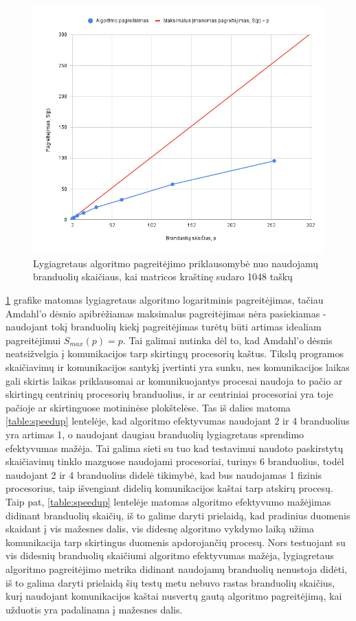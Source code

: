 \documentclass{VUMIFPSbakalaurinis}
\begin{document}
\begin{figure}[H]
    \centering
    \includegraphics[scale=0.5]{img/parallel_speedup.png}
    \caption{Lygiagretaus algoritmo pagreitėjimo priklausomybė nuo naudojamų branduolių skaičiaus, kai matricos kraštinę sudaro 1048 taškų}
    \label{img:parallel_speedup}
\end{figure}


\ref{img:parallel_speedup} grafike matomas lygiagretaus algoritmo logaritminis pagreitėjimas, tačiau Amdahl'o dėsnio \cite{amdahl1967validity} apibrėžiamas maksimalus pagreitėjimas nėra pasiekiamas - naudojant tokį branduolių kiekį pagreitėjimas turėtų būti artimas idealiam pagreitėjimui  $S_{max}(p)=p$.
Tai galimai nutinka dėl to, kad Amdahl'o dėsnis neatsižvelgia į komunikacijos tarp skirtingų procesorių kaštus.
Tikslų programos skaičiavimų ir komunikacijos santykį įvertinti yra sunku, nes komunikacijos laikas gali skirtis laikas priklausomai ar komunikuojantys procesai naudoja to pačio ar skirtingų centrinių procesorių branduolius, 
ir ar centriniai procesoriai yra toje pačioje ar skirtinguose motininėse plokštelėse. 
Tas iš dalies matoma \ref{table:speedup} lentelėje, kad algoritmo efektyvumas naudojant 2 ir 4 branduolius yra artimas 1, o naudojant daugiau branduolių lygiagretaus sprendimo efektyvumas mažėja.
Tai galima sieti su tuo kad testavimui naudoto paskirstytų skaičiavimų tinklo mazguose naudojami procesoriai, turinys 6 branduolius, todėl naudojant 2 ir 4 branduolius didelė tikimybė, kad bus naudojamas 1 fizinis procesorius, taip išvengiant didelių komunikacijos kaštai tarp atskirų procesų.
Taip pat, \ref{table:speedup} lentelėje matomas algoritmo efektyvumo mažėjimas didinant branduolių skaičių, iš to galime daryti prielaidą, kad pradinius duomenis skaidant į vis mažesnes dalis, vis didesnę algoritmo vykdymo laiką užima komunikacija tarp skirtingus duomenis apdorojančių procesų.
Nors testuojant su vis didesnių branduolių skaičiumi algoritmo efektyvumas mažėja, lygiagretaus algoritmo pagreitėjimo metrika didinant naudojamų branduolių nenustoja didėti, iš to galima daryti prielaidą šių testų metu nebuvo rastas branduolių skaičius, kurį naudojant komunikacijos kaštai nusvertų gautą algoritmo pagreitėjimą, kai užduotis yra padalinama į mažesnes dalis. 
\end{document}

